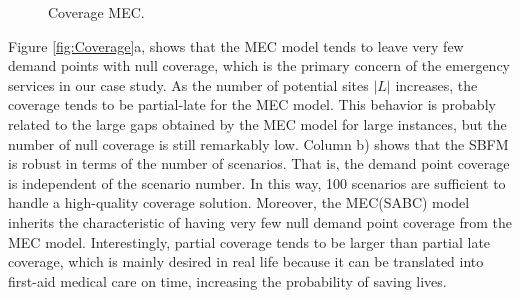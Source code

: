 \begin{figure}[H]
\hspace{0.4cm}%
\vspace{0.4cm}
\caption{Coverage MEC.}
\label{Cov_MEC}
\end{figure}
   


Figure \ref{fig:Coverage}a, shows that the MEC model tends to leave very few demand points with null coverage, which is the primary concern of the emergency services in our case study. As the number of potential sites $|L|$ increases, the coverage tends to be partial-late for the MEC model. This behavior is probably related to the large gaps obtained by the MEC model for large instances, but the number of null coverage is still remarkably low.  
Column b) shows that the SBFM is robust in terms of the number of scenarios. That is, the demand point coverage is independent of the scenario number. In this way, 100 scenarios are sufficient to handle a high-quality coverage solution. Moreover, the MEC(SABC) model inherits the characteristic of having very few null demand point coverage from the MEC model. Interestingly, partial coverage tends to be larger than partial late coverage, which is mainly desired in real life because it can be translated into first-aid medical care on time, increasing the probability of saving lives. 

